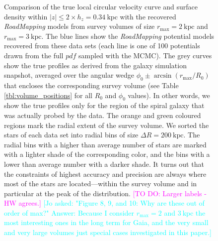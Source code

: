 \documentclass[iop,revtex4,numberedappendix,appendixfloats]{emulateapj}
\newcommand{\RM}{{\sl RoadMapping}}
\newcommand{\Wilma}[1]{\textcolor{Magenta}{#1}}
\newcommand{\Jo}[1]{\textcolor{Cyan}{#1}}
\begin{document}
\begin{figure}[!htbp]
\centering
\caption{Comparison of the true local circular velocity curve and surface density within $|z| \leq 2 \times h_z = 0.34~\text{kpc}$ with the recovered \RM{} models from survey volumes of size $r_\text{max}=2~\text{kpc}$ and $r_\text{max}=3~\text{kpc}$. The blue lines show the \RM{} potential models recovered from these data sets (each line is one of 100 potentials drawn from the full $pdf$ sampled with the MCMC). The grey curves show the true profiles as derived from the galaxy simulation snapshot, averaged over the angular wedge $\phi_0\pm\arcsin(r_\text{max}/R_0)$ that encloses the corresponding survey volume (see Table \ref{tbl:volume_positions} for all $R_0$ and $\phi_0$ values). In other words, we show the true profiles only for the region of the spiral galaxy that was actually probed by the data. The orange and green coloured regions mark the radial extent of the survey volume. We sorted the stars of each data set into radial bins of size $\Delta R = 200~\text{kpc}$. The radial bins with a higher than average number of stars are marked with a lighter shade of the corresponding color, and the bins with a lower than average number with a darker shade. It turns out that the constraints of highest accuracy and precision are always where most of the stars are located---within the survey volume and in particular at the peak of the distribution. \Wilma{[TO DO: Larger labels - HW agrees.]} \Jo{[Jo asked: "Figure 8, 9, and 10: Why are these out of order of max?" Answer: Because I consider $r_\text{max}=2$ and $3~\text{kpc}$ the most interesting ones in the long term for Gaia, and the very small and very large volumes just special cases investigated in this paper.]}}
    \label{fig:vcirc_surfdens_suite_medium}
\end{figure}
\end{document}
